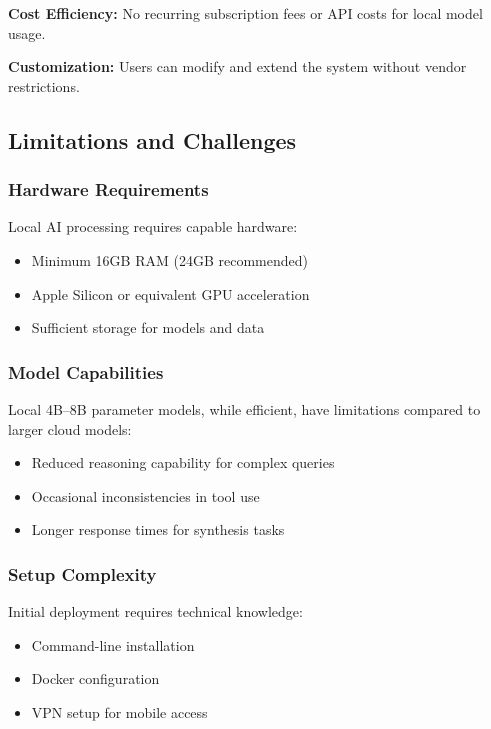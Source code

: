 \documentclass[11pt,letterpaper]{article}
\begin{document}
\textbf{Cost Efficiency:} No recurring subscription fees or API costs for local model usage.

\textbf{Customization:} Users can modify and extend the system without vendor restrictions.

\subsection{Limitations and Challenges}

\subsubsection{Hardware Requirements}

Local AI processing requires capable hardware:
\begin{itemize}
\item Minimum 16GB RAM (24GB recommended)
\item Apple Silicon or equivalent GPU acceleration
\item Sufficient storage for models and data
\end{itemize}

\subsubsection{Model Capabilities}

Local 4B--8B parameter models, while efficient, have limitations compared to larger cloud models:
\begin{itemize}
\item Reduced reasoning capability for complex queries
\item Occasional inconsistencies in tool use
\item Longer response times for synthesis tasks
\end{itemize}

\subsubsection{Setup Complexity}

Initial deployment requires technical knowledge:
\begin{itemize}
\item Command-line installation
\item Docker configuration
\item VPN setup for mobile access
\end{itemize}
\end{document}
